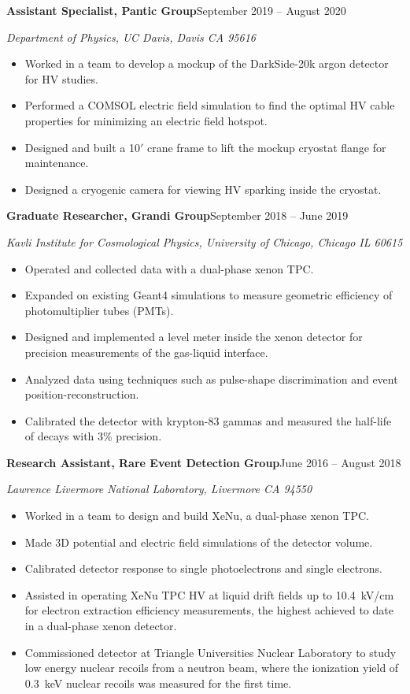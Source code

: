 \documentclass[11pt,letterpaper]{article}
\newcommand{\entry}[2]{%
  \needspace{3\baselineskip}%
  \noindent\textbf{#1}\hfill #2\par}
\newcommand{\affil}[1]{\noindent\textit{#1}\par\vspace{1pt}}
\begin{document}
\vspace{0.4\baselineskip}
\entry{Assistant Specialist, Pantic Group}{September 2019 -- August 2020}
\affil{Department of Physics, UC Davis, Davis CA 95616}
\begin{itemize}
  \item Worked in a team to develop a mockup of the DarkSide-20k argon detector for HV
        studies.
  \item Performed a COMSOL electric field simulation to find the optimal HV cable
        properties for minimizing an electric field hotspot.
  \item Designed and built a 10$'$ crane frame to lift the mockup cryostat flange for
        maintenance.
  \item Designed a cryogenic camera for viewing HV sparking inside the cryostat.
\end{itemize}

\vspace{0.4\baselineskip}
\entry{Graduate Researcher, Grandi Group}{September 2018 -- June 2019}
\affil{Kavli Institute for Cosmological Physics, University of Chicago, Chicago IL 60615}
\begin{itemize}
  \item Operated and collected data with a dual-phase xenon TPC.
  \item Expanded on existing Geant4 simulations to measure geometric efficiency of
        photomultiplier tubes (PMTs).
  \item Designed and implemented a level meter inside the xenon detector for precision
        measurements of the gas-liquid interface.
  \item Analyzed data using techniques such as pulse-shape discrimination and event
        position-reconstruction.
  \item Calibrated the detector with krypton-83 gammas and measured the half-life of
        decays with 3\% precision.
\end{itemize}

\vspace{0.4\baselineskip}
\entry{Research Assistant, Rare Event Detection Group}{June 2016 -- August 2018}
\affil{Lawrence Livermore National Laboratory, Livermore CA 94550}
\begin{itemize}
  \item Worked in a team to design and build XeNu, a dual-phase xenon TPC.
  \item Made 3D potential and electric field simulations of the detector volume.
  \item Calibrated detector response to single photoelectrons and single electrons.
  \item Assisted in operating XeNu TPC HV at liquid drift fields up to 10.4~kV/cm for
        electron extraction efficiency measurements, the highest achieved to date in a
        dual-phase xenon detector.
  \item Commissioned detector at Triangle Universities Nuclear Laboratory to study low
        energy nuclear recoils from a neutron beam, where the ionization yield of
        0.3~keV nuclear recoils was measured for the first time.
\end{itemize}
\end{document}
